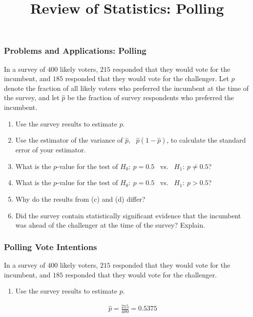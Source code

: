 \title[Probability]{Review of Statistics: Polling}
\date{}







\def\ask{In a survey of $400$ likely voters, $215$ responded that they would vote for the incumbent, and $185$ responded that they would vote for the challenger.}


\begin{frame}
\frametitle{Problems and Applications: Polling}
In a survey of $400$ likely voters, $215$ responded that they would vote for the incumbent, and $185$ responded that they would vote for the challenger. Let $p$ denote the fraction of all likely voters who preferred the incumbent at the time of the survey, and let $\hat{p}$ be the fraction of survey respondents who preferred the incumbent.
\begin{enumerate}
\item Use the survey results to estimate $p$.
\item Use the estimator of the variance of $\hat{p}$,~  $\hat{p}(1-\hat{p})$, to calculate the standard error of your estimator. 
\item What is the $p$-value for the test of $H_{0}{:}~ p=0.5$ ~vs.~ $H_{1}{:}~ p\neq 0.5$?
\item What is the $p$-value for the test of $H_{0}{:}~ p=0.5$ ~vs.~ $H_{1}{:}~ p > 0.5$?
\item Why do the results from (c) and (d) differ?
\item Did the survey contain statistically significant evidence that the incumbent was ahead of the challenger at the time of the survey? Explain.
\end{enumerate}
\end{frame}


\begin{frame}
\frametitle{Polling Vote Intentions}
\ask
\begin{enumerate}\setcounter{enumi}{0}

\item Use the survey results to estimate $p$.


\begin{answer}
\begin{align*}
\hat{p} 
  = \frac{215}{400} 
  = 0.5375 
\end{align*}
\end{answer}

\end{enumerate}
\end{frame}



